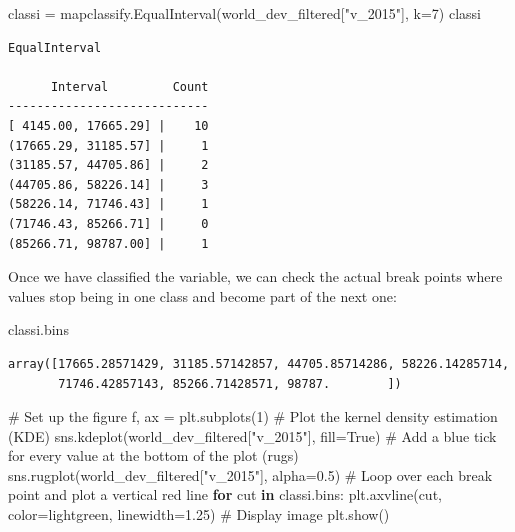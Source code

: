 \documentclass[
  letterpaper,
  DIV=11,
  numbers=noendperiod]{scrreprt}
\newenvironment{Shaded}{\begin{snugshade}}{\end{snugshade}}
\newcommand{\CommentTok}[1]{\textcolor[rgb]{0.37,0.37,0.37}{#1}}
\newcommand{\ControlFlowTok}[1]{\textcolor[rgb]{0.00,0.23,0.31}{\textbf{#1}}}
\newcommand{\DecValTok}[1]{\textcolor[rgb]{0.68,0.00,0.00}{#1}}
\newcommand{\FloatTok}[1]{\textcolor[rgb]{0.68,0.00,0.00}{#1}}
\newcommand{\KeywordTok}[1]{\textcolor[rgb]{0.00,0.23,0.31}{\textbf{#1}}}
\newcommand{\NormalTok}[1]{\textcolor[rgb]{0.00,0.23,0.31}{#1}}
\newcommand{\OperatorTok}[1]{\textcolor[rgb]{0.37,0.37,0.37}{#1}}
\newcommand{\StringTok}[1]{\textcolor[rgb]{0.13,0.47,0.30}{#1}}
\newcommand{\VariableTok}[1]{\textcolor[rgb]{0.07,0.07,0.07}{#1}}
\begin{document}
\begin{Shaded}
\begin{Highlighting}[]
\NormalTok{classi }\OperatorTok{=}\NormalTok{ mapclassify.EqualInterval(world\_dev\_filtered[}\StringTok{"v\_2015"}\NormalTok{], k}\OperatorTok{=}\DecValTok{7}\NormalTok{)}
\NormalTok{classi}
\end{Highlighting}
\end{Shaded}

\begin{verbatim}
EqualInterval

      Interval         Count
----------------------------
[ 4145.00, 17665.29] |    10
(17665.29, 31185.57] |     1
(31185.57, 44705.86] |     2
(44705.86, 58226.14] |     3
(58226.14, 71746.43] |     1
(71746.43, 85266.71] |     0
(85266.71, 98787.00] |     1
\end{verbatim}

Once we have classified the variable, we can check the actual break
points where values stop being in one class and become part of the next
one:

\begin{Shaded}
\begin{Highlighting}[]
\NormalTok{classi.bins}
\end{Highlighting}
\end{Shaded}

\begin{verbatim}
array([17665.28571429, 31185.57142857, 44705.85714286, 58226.14285714,
       71746.42857143, 85266.71428571, 98787.        ])
\end{verbatim}

\begin{Shaded}
\begin{Highlighting}[]
\CommentTok{\# Set up the figure}
\NormalTok{f, ax }\OperatorTok{=}\NormalTok{ plt.subplots(}\DecValTok{1}\NormalTok{)}
\CommentTok{\# Plot the kernel density estimation (KDE)}
\NormalTok{sns.kdeplot(world\_dev\_filtered[}\StringTok{"v\_2015"}\NormalTok{], fill}\OperatorTok{=}\VariableTok{True}\NormalTok{)}
\CommentTok{\# Add a blue tick for every value at the bottom of the plot (rugs)}
\NormalTok{sns.rugplot(world\_dev\_filtered[}\StringTok{"v\_2015"}\NormalTok{], alpha}\OperatorTok{=}\FloatTok{0.5}\NormalTok{)}
\CommentTok{\# Loop over each break point and plot a vertical red line}
\ControlFlowTok{for}\NormalTok{ cut }\KeywordTok{in}\NormalTok{ classi.bins:}
\NormalTok{    plt.axvline(cut, color}\OperatorTok{=}\StringTok{\textquotesingle{}lightgreen\textquotesingle{}}\NormalTok{, linewidth}\OperatorTok{=}\FloatTok{1.25}\NormalTok{)}
\CommentTok{\# Display image}
\NormalTok{plt.show()}
\end{Highlighting}
\end{Shaded}
\end{document}
